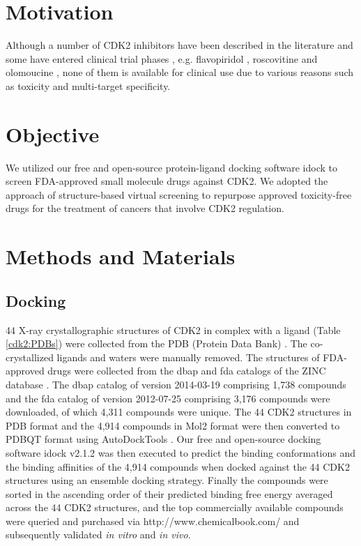 \section{Motivation}

Although a number of CDK2 inhibitors have been described in the literature and some have entered clinical trial phases \citep{1603}, e.g. flavopiridol \citep{1596}, roscovitine \citep{1597} and olomoucine \citep{1598}, none of them is available for clinical use due to various reasons such as toxicity and multi-target specificity.

\section{Objective}

We utilized our free and open-source protein-ligand docking software idock \citep{1153,1362} to screen FDA-approved small molecule drugs against CDK2. We adopted the approach of structure-based virtual screening to repurpose approved toxicity-free drugs for the treatment of cancers that involve CDK2 regulation.

\section{Methods and Materials}

\subsection{Docking}

44 X-ray crystallographic structures of CDK2 in complex with a ligand (Table \ref{cdk2:PDBs}) were collected from the PDB (Protein Data Bank) \citep{540,537}. The co-crystallized ligands and waters were manually removed. The structures of FDA-approved drugs were collected from the dbap and fda catalogs of the ZINC database \citep{532,1178}. The dbap catalog of version 2014-03-19 comprising 1,738 compounds and the fda catalog of version 2012-07-25 comprising 3,176 compounds were downloaded, of which 4,311 compounds were unique. The 44 CDK2 structures in PDB format and the 4,914 compounds in Mol2 format were then converted to PDBQT format using AutoDockTools \citep{596}. Our free and open-source docking software idock v2.1.2 \citep{1153,1362} was then executed to predict the binding conformations and the binding affinities of the 4,914 compounds when docked against the 44 CDK2 structures using an ensemble docking strategy. Finally the compounds were sorted in the ascending order of their predicted binding free energy averaged across the 44 CDK2 structures, and the top commercially available compounds were queried and purchased via http://www.chemicalbook.com/ and subsequently validated \textit{in vitro} and \textit{in vivo}.

